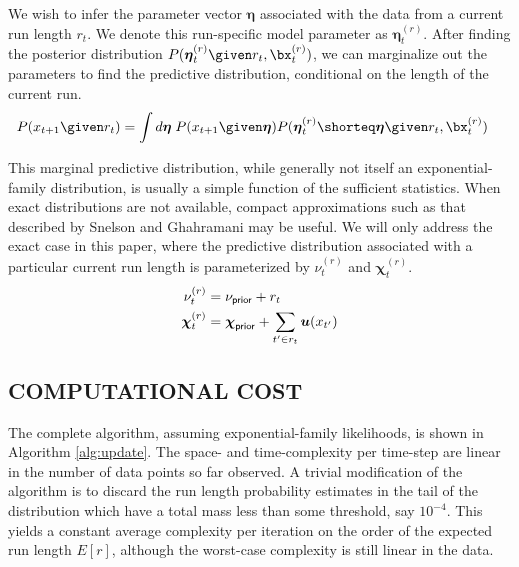\documentclass[]{article}
\newcommand{\boldeta}{\ensuremath{\boldsymbol{\eta}}}
\newcommand{\bchi}{\ensuremath{\boldsymbol{\chi}}}
\begin{document}
      We wish to infer the parameter vector $\boldeta$ associated with the
      data from a current run length $r_{t}$.  We denote this run-specific
      model parameter as $\boldeta_{t}^{(r)}$.  After finding the posterior
      distribution $P(\boldeta_{t}^{(r)} \given r_{t},\bx_{t}^{(r)})$, we
      can marginalize out the parameters to find the predictive
      distribution, conditional on the length of the current run.
      \begin{align}\label{eqn:exponential-predictive}
	P(x_{t+1} \given r_{t}) &=
	\int d\boldeta\; P(x_{t+1}\given\boldeta)
	               P(\boldeta_{t}^{(r)}\shorteq\boldeta \given
		        r_{t},\bx_{t}^{(r)})
      \end{align}

      This marginal predictive distribution, while generally not itself an
      exponential-family distribution, is usually a simple function of the
      sufficient statistics.  When exact distributions are not available,
      compact approximations such as that described by Snelson and
      Ghahramani \cite{snelson-ghahramani-2005a} may be useful.  We will
      only address the exact case in this paper, where the predictive
      distribution associated with a particular current run length is
      parameterized by $\nu_{t}^{(r)}$ and $\bchi_{t}^{(r)}$.
      \begin{align}
	\label{eqn:posterior-nu}
	\nu_{t}^{(r)} &= \nu_{\sf{prior}} + r_{t}\\
	\label{eqn:posterior-chi}
	\bchi_{t}^{(r)} &= \bchi_{\sf{prior}}
	  + \sum_{t'\in r_{t}}\boldsymbol{u}(x_{t'})
      \end{align}
    
    \subsection{COMPUTATIONAL COST}
      The complete algorithm, assuming exponential-family likelihoods, is
      shown in Algorithm \ref{alg:update}.  The space- and time-complexity
      per time-step are linear in the number of data points so far
      observed.  A trivial modification of the algorithm is to discard the
      run length probability estimates in the tail of the distribution
      which have a total mass less than some threshold, say $10^{-4}$.
      This yields a constant average complexity per iteration on the order
      of the expected run length $E[r]$, although the worst-case complexity
      is still linear in the data.
\end{document}
